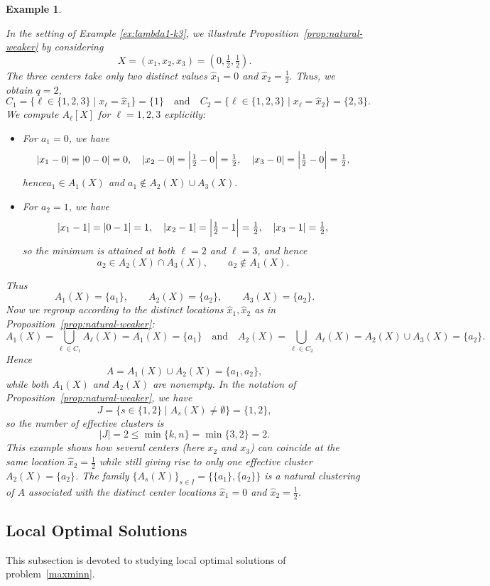 \documentclass[11pt]{article}
\newtheorem{example}[theorem]{Example}
\theoremstyle{definition}
\newcommand{\1}{\mathbf{1}}
\begin{document}
\begin{example}\label{ex2:lambda1-k3}
{\rm In the setting of Example \ref{ex:lambda1-k3}, we illustrate Proposition~\ref{prop:natural-weaker} by considering
\[
X=(x_1,x_2,x_3)=(0,\tfrac{1}{2},\tfrac{1}{2}).
\]
The three centers take only two distinct values $
\widehat x_1=0$ and $\widehat x_2=\tfrac{1}{2}.$
Thus, we obtain $q=2$, 
\[
C_1=\{\ell\in\{1,2,3\}\mid x_\ell=\widehat x_1\}=\{1\}\quad\text{and}\quad
C_2=\{\ell\in\{1,2,3\}\mid x_\ell=\widehat x_2\}=\{2,3\}.
\]
We compute $A_\ell[X]$ for $\ell=1,2,3$ explicitly:
\begin{itemize}
\item For $a_1=0$, we have
\[
|x_1-0|=|0-0|=0,\quad
|x_2-0|=\Bigl|\tfrac{1}{2}-0\Bigr|=\tfrac{1}{2},\quad
|x_3-0|=\Bigl|\tfrac{1}{2}-0\Bigr|=\tfrac{1}{2},
\]
 hence$a_1\in A_1(X)$ and $a_1\notin A_2(X)\cup A_3(X).$
\item For $a_2=1$, we have
\[
|x_1-1|=|0-1|=1,\quad
|x_2-1|=\Bigl|\tfrac{1}{2}-1\Bigr|=\tfrac{1}{2},\quad
|x_3-1|=\tfrac{1}{2},
\]
so the minimum is attained at both $\ell=2$ and $\ell=3$, and hence
\[
a_2\in A_2(X)\cap A_3(X),\qquad a_2\notin A_1(X).
\]
\end{itemize}
Thus
\[
A_1(X)=\{a_1\},\qquad A_2(X)=\{a_2\},\qquad A_3(X)=\{a_2\}.
\]
Now we regroup according to the distinct locations $\widehat x_1,\widehat x_2$
as in Proposition~\ref{prop:natural-weaker}:
\[
A_1(X)=\bigcup_{\ell\in C_1}A_\ell(X)=A_1(X)=\{a_1\}\quad\text{and}\quad
A_2(X)=\bigcup_{\ell\in C_2}A_\ell(X)=A_2(X)\cup A_3(X)=\{a_2\}.
\]
Hence
\[
A=A_1(X)\cup A_2(X)=\{a_1,a_2\},
\]
while both $A_1(X)$ and $A_2(X)$ are nonempty. In the notation of
Proposition~\ref{prop:natural-weaker}, we have
\[
J=\{s\in\{1,2\}\mid A_s(X)\neq\emptyset\}=\{1,2\},
\]
so the number of effective clusters is
\[
|J|=2\le\min\{k,n\}=\min\{3,2\}=2.
\]
This example shows how several centers (here $x_2$ and $x_3$) can coincide at
the same location $\widehat x_2=\tfrac{1}{2}$ while still giving rise to only
one effective cluster $A_2(X)=\{a_2\}$. The family
$\{A_s(X)\}_{s\in I}=\bigl\{\{a_1\},\{a_2\}\bigr\}$ is a natural clustering of
$A$ associated with the distinct center locations $\widehat x_1=0$ and
$\widehat x_2=\tfrac{1}{2}$.}
\end{example}


\subsection{Local Optimal Solutions}

This subsection is devoted to studying local optimal solutions of problem~\eqref{maxminn}.
\end{document}
